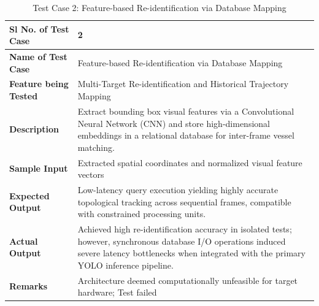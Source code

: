 \begin{table}[H]
\centering
\caption{Test Case 2: Feature-based Re-identification via Database Mapping}
\label{tab:testcase2}
\begin{tabular}{|p{}|p{}|}
\hline
\textbf{Sl No. of Test Case} & 2 \\
\hline
\textbf{Name of Test Case} & Feature-based Re-identification via Database Mapping \\
\hline
\textbf{Feature being Tested} & Multi-Target Re-identification and Historical Trajectory Mapping \\
\hline
\textbf{Description} & Extract bounding box visual features via a Convolutional Neural Network (CNN) and store high-dimensional embeddings in a relational database for inter-frame vessel matching. \\
\hline
\textbf{Sample Input} & Extracted spatial coordinates and normalized visual feature vectors \\
\hline
\textbf{Expected Output} & Low-latency query execution yielding highly accurate topological tracking across sequential frames, compatible with constrained processing units. \\
\hline
\textbf{Actual Output} & Achieved high re-identification accuracy in isolated tests; however, synchronous database I/O operations induced severe latency bottlenecks when integrated with the primary YOLO inference pipeline. \\
\hline
\textbf{Remarks} & Architecture deemed computationally unfeasible for target hardware; Test failed \\
\hline
\end{tabular}
\end{table}

